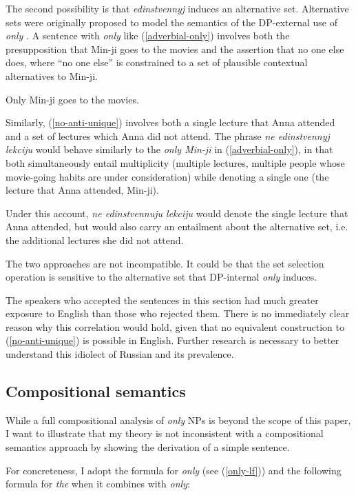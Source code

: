 The second possibility is that \textit{edinstvennyj} induces an alternative set. Alternative sets were originally proposed to model the semantics of the DP-external use of \textit{only} \citep{rooth85, rooth92}.
A sentence with \textit{only} like (\ref{adverbial-only}) involves both the presupposition that Min-ji goes to the movies and the assertion that no one else does, where ``no one else'' is constrained to a set of plausible contextual alternatives to Min-ji.

\begin{exe}
	\ex \label{adverbial-only} Only Min-ji goes to the movies.
\end{exe}

Similarly, (\ref{no-anti-unique}) involves both a single lecture that Anna attended and a set of lectures which Anna did not attend. The phrase \textit{ne edinstvennyj lekciju} would behave similarly to the \textit{only Min-ji} in (\ref{adverbial-only}), in that both simultaneously entail multiplicity (multiple lectures, multiple people whose movie-going habits are under consideration) while denoting a single one (the lecture that Anna attended, Min-ji).

Under this account, \textit{ne edinstvennuju lekciju} would denote the single lecture that Anna attended, but would also carry an entailment about the alternative set, i.e. the additional lectures she did not attend.

The two approaches are not incompatible. It could be that the set selection operation is sensitive to the alternative set that DP-internal \textit{only} induces.

The speakers who accepted the sentences in this section had much greater exposure to English than those who rejected them. There is no immediately clear reason why this correlation would hold, given that no equivalent construction to (\ref{no-anti-unique}) is possible in English. Further research is necessary to better understand this idiolect of Russian and its prevalence.

\subsection{Compositional semantics}
While a full compositional analysis of \textit{only} NPs is beyond the scope of this paper, I want to illustrate that my theory is not inconsistent with a compositional semantics approach by showing the derivation of a simple sentence.

For concreteness, I adopt the  formula for \textit{only} (see (\ref{only-lf})) and the following formula for \textit{the} when it combines with \textit{only}:

